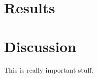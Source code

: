 \documentclass[12pt]{article}
\begin{document}
      

\section{Results}

\section{Discussion}

This is really important stuff.



\end{document}
